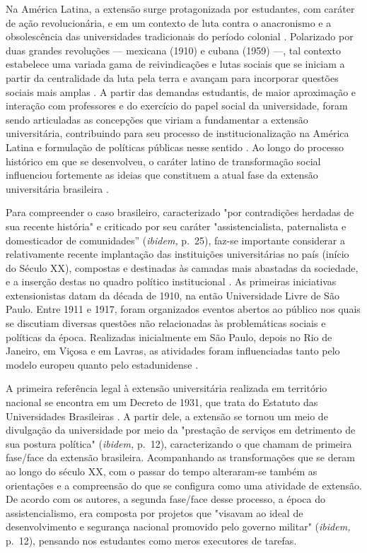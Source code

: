 \documentclass[portuguese]{textolivre}
\begin{document}
Na América Latina, a extensão surge protagonizada por estudantes, com
caráter de ação revolucionária, e em um contexto de luta contra o
anacronismo e a obsolescência das universidades tradicionais do período
colonial \cite{Oliveira2015,Paula2013}. Polarizado por duas
grandes revoluções --- mexicana (1910) e cubana (1959) ---, tal contexto
estabelece uma variada gama de reivindicações e lutas sociais que se
iniciam a partir da centralidade da luta pela terra e avançam para
incorporar questões sociais mais amplas \cite{Paula2013}. A partir das
demandas estudantis, de maior aproximação e interação com professores e
do exercício do papel social da universidade, foram sendo articuladas as
concepções que viriam a fundamentar a extensão universitária,
contribuindo para seu processo de institucionalização na América Latina
e formulação de políticas públicas nesse sentido \cite{Gomez2019}. Ao
longo do processo histórico em que se desenvolveu, o caráter latino de
transformação social influenciou fortemente as ideias que constituem a
atual fase da extensão universitária brasileira \cite{Oliveira2015}.

Para compreender o caso brasileiro, caracterizado "por contradições
herdadas de sua recente história" \cite[p.~24]{Carbonari2007} e
criticado por seu caráter "assistencialista, paternalista e domesticador
de comunidades'' (\emph{ibidem, }p.~25), faz-se importante considerar a
relativamente recente implantação das instituições universitárias no
país (início do Século XX), compostas e destinadas às camadas mais
abastadas da sociedade, e a inserção destas no quadro político
institucional \cite{Gomez2019}. As primeiras iniciativas extensionistas
datam da década de 1910, na então Universidade Livre de São Paulo. Entre
1911 e 1917, foram organizados eventos abertos ao público nos quais se
discutiam diversas questões não relacionadas às problemáticas sociais e
políticas da época. Realizadas inicialmente em São Paulo, depois no Rio
de Janeiro, em Viçosa e em Lavras, as atividades foram influenciadas
tanto pelo modelo europeu quanto pelo estadunidense
\cite{Carbonari2007, Oliveira2015, Paula2013}.

A primeira referência legal à extensão universitária realizada em
território nacional se encontra em um Decreto de 1931, que trata do
Estatuto das Universidades Brasileiras \cite{Oliveira2015}. A partir
dele, a extensão se tornou um meio de divulgação da universidade por
meio da "prestação de serviços em detrimento de sua postura política"
(\emph{ibidem, }p.~12), caracterizando o que \textcite{Oliveira2015}
chamam de primeira fase/face da extensão brasileira. Acompanhando as
transformações que se deram ao longo do século XX, com o passar do tempo
alteraram-se também as orientações e a compreensão do que se configura
como uma atividade de extensão. De acordo com os autores, a segunda
fase/face desse processo, a época do assistencialismo, era composta por
projetos que "visavam ao ideal de desenvolvimento e segurança nacional
promovido pelo governo militar" (\emph{ibidem, }p.~12), pensando nos
estudantes como meros executores de tarefas.
\end{document}
